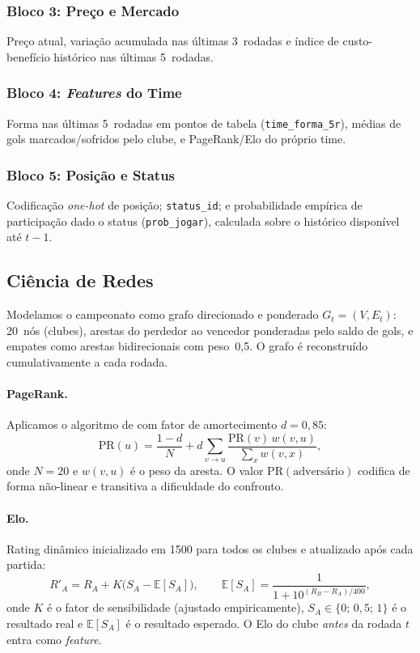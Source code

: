 \documentclass[12pt, a4paper, oneside]{article}
\begin{document}
\subsubsection*{Bloco 3: Preço e Mercado}
Preço atual, variação acumulada nas últimas 3~rodadas e índice de
custo-benefício histórico nas últimas 5~rodadas.

\subsubsection*{Bloco 4: \textit{Features} do Time}
Forma nas últimas 5~rodadas em pontos de tabela (\texttt{time\_forma\_5r}),
médias de gols marcados/sofridos pelo clube, e PageRank/Elo do próprio time.

\subsubsection*{Bloco 5: Posição e Status}
Codificação \textit{one-hot} de posição; \texttt{status\_id}; e probabilidade
empírica de participação dado o status (\texttt{prob\_jogar}), calculada sobre
o histórico disponível até $t-1$.

\subsection{Ciência de Redes}
\label{subsec:redes}

Modelamos o campeonato como grafo direcionado e ponderado
$G_t = (V, E_t)$: 20~nós (clubes), arestas do perdedor ao vencedor ponderadas pelo
saldo de gols, e empates como arestas bidirecionais com peso~0,5. O grafo é
reconstruído cumulativamente a cada rodada.

\paragraph{PageRank.}
Aplicamos o algoritmo de \citet{page1999} com fator de amortecimento $d = 0{,}85$:
\begin{equation}
  \mathrm{PR}(u) = \frac{1-d}{N} + d \sum_{v \to u}
  \frac{\mathrm{PR}(v)\,w(v,u)}{\displaystyle\sum_{x} w(v,x)},
  \label{eq:pagerank}
\end{equation}
onde $N = 20$ e $w(v,u)$ é o peso da aresta. O valor $\mathrm{PR}(\text{adversário})$
codifica de forma não-linear e transitiva a dificuldade do confronto.

\paragraph{Elo.}
Rating dinâmico inicializado em 1500 para todos os clubes e atualizado após cada
partida:
\begin{equation}
  R'_A = R_A + K\bigl(S_A - \mathbb{E}[S_A]\bigr),
  \qquad
  \mathbb{E}[S_A] = \frac{1}{1 + 10^{(R_B - R_A)/400}},
  \label{eq:elo}
\end{equation}
onde $K$ é o fator de sensibilidade (ajustado empiricamente), $S_A \in \{0;\,0{,}5;\,1\}$
é o resultado real e $\mathbb{E}[S_A]$ é o resultado esperado. O Elo do clube
\emph{antes} da rodada $t$ entra como \textit{feature}.
\end{document}
